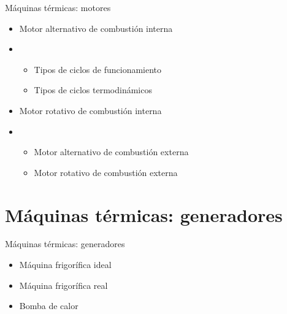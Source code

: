\documentclass{beamer}
\begin{document}
\begin{frame}{Máquinas térmicas: motores}
    \begin{itemize}
        \item Motor alternativo de combustión interna
        \item  \begin{itemize}
            \item Tipos de ciclos de funcionamiento
            \item Tipos de ciclos termodinámicos
        \end{itemize}
        \item Motor rotativo de combustión interna
        \item \begin{itemize}
            \item Motor alternativo de combustión externa
            \item Motor rotativo de combustión externa
        \end{itemize}
    \end{itemize}
  
\end{frame}



\section{Máquinas térmicas: generadores}
\begin{frame}{Máquinas térmicas: generadores}
    \begin{itemize}
        \item Máquina frigorífica ideal
        \item Máquina frigorífica real
        \item Bomba de calor
    \end{itemize}
  
\end{frame}



\ThankYouFrame
\end{document}
